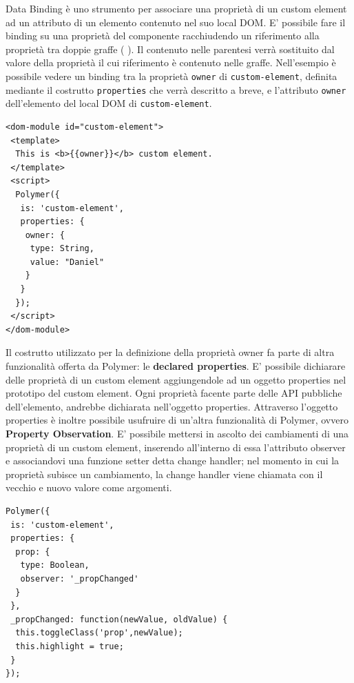 Data Binding è uno strumento per associare una proprietà di un custom element ad un attributo di un elemento contenuto nel suo local DOM. E’ possibile fare il binding su una proprietà del componente racchiudendo un riferimento alla proprietà tra doppie graffe ({{ }}). Il contenuto nelle parentesi verrà sostituito dal valore della proprietà il cui riferimento è contenuto nelle graffe. Nell’esempio è possibile vedere un binding tra la proprietà \texttt{owner} di \texttt{custom-element}, definita mediante il costrutto \texttt{properties} che verrà descritto a breve, e l’attributo \texttt{owner} dell’elemento del local DOM di \texttt{custom-element}. 
\begin{lstlisting}[language=HTML5]
<dom-module id="custom-element">
 <template>
  This is <b>{{owner}}</b> custom element.
 </template>
 <script>
  Polymer({
   is: 'custom-element',
   properties: {
    owner: {
     type: String,
     value: "Daniel"
    }
   }
  });
 </script>
</dom-module>
\end{lstlisting}
Il costrutto utilizzato per la definizione della proprietà owner fa parte di altra funzionalità offerta da Polymer: le \textbf{declared properties}. 
E’ possibile dichiarare delle proprietà di un custom element aggiungendole ad un oggetto properties nel prototipo del custom element. Ogni proprietà facente parte delle API pubbliche dell’elemento, andrebbe dichiarata nell’oggetto properties. Attraverso l’oggetto properties è inoltre possibile usufruire di un’altra funzionalità di Polymer, ovvero \textbf{Property Observation}. 
E’ possibile mettersi in ascolto dei cambiamenti di una proprietà di un custom element, inserendo all’interno di essa l’attributo observer e associandovi una funzione setter detta change handler; nel momento in cui la proprietà subisce un cambiamento, la change handler viene chiamata con il vecchio e nuovo valore come argomenti.
\begin{lstlisting}[language=HTML5]
Polymer({
 is: 'custom-element',
 properties: {
  prop: {
   type: Boolean,
   observer: '_propChanged'
  }
 },
 _propChanged: function(newValue, oldValue) {
  this.toggleClass('prop',newValue);
  this.highlight = true;
 }
});
\end{lstlisting}